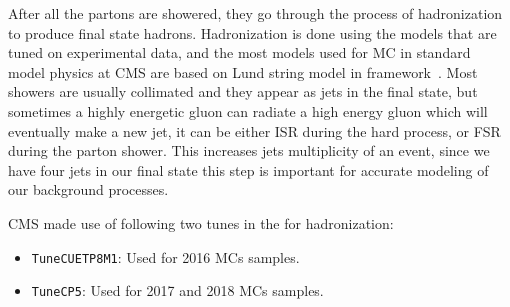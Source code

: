 After all the partons are showered, they go through the process of
hadronization to produce final state hadrons.
Hadronization is done using the models that are tuned on experimental data,
and the most models used for \gls{MC} in standard model physics at \gls{CMS}
are based on Lund string model in \PYTHIA{} framework~\cite{pythia}.
Most showers are usually collimated and they appear
as jets in the final state, but sometimes a highly energetic gluon
can radiate a high energy gluon which will eventually
make a new jet, it can be either \gls{ISR} during the hard process,
or \gls{FSR} during the parton shower.
This increases jets multiplicity of an event,
since we have four jets in our final state this step is important for
accurate modeling of our background processes.

\gls{CMS} made use of following two tunes in the \PYTHIA{} for hadronization:

\begin{itemize}
  \item \texttt{TuneCUETP8M1}: Used for 2016 \glspl{MC} samples.
  \item \texttt{TuneCP5}: Used for 2017 and 2018 \glspl{MC} samples.
\end{itemize}